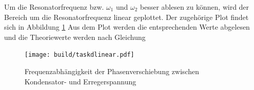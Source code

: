 Um die Resonatorfrequenz bzw. $\omega_1$ und $\omega_2$ besser ablesen zu können, wird der Bereich um die Resonatorfrequenz linear geplottet.
Der zugehörige Plot findet sich in Abbildung \ref{fig:phasenplotlinear} 
Aus dem Plot werden die entsprechenden Werte abgelesen und die Theoriewerte werden nach Gleichung

\begin{figure}
	\centering
	\texttt{[image: build/taskdlinear.pdf]}
	\caption{Frequenzabhängigkeit der Phasenverschiebung zwischen Kondensator- und Erregerspannung}
	\label{fig:phasenplotlinear}
\end{figure}
